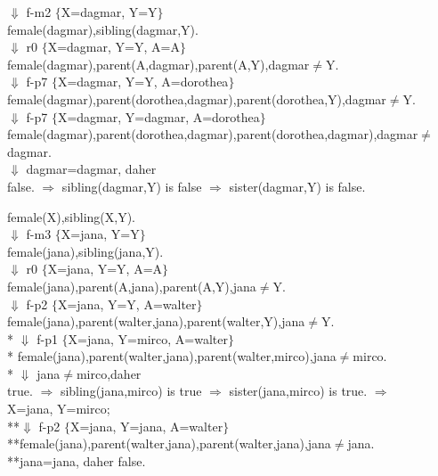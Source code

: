 \documentclass[a4paper, dvipsnames]{article}
\begin{document}
{{\begin{flushleft}
 $\Downarrow$ f-m2 $\lbrace$X=dagmar, Y=Y$\rbrace$\\
 female(dagmar),sibling(dagmar,Y).\\
 $\Downarrow$ r0 $\lbrace$X=dagmar, Y=Y, A=A$\rbrace$\\
 female(dagmar),parent(A,dagmar),parent(A,Y),dagmar$\neq$Y. \\
 $\Downarrow$ f-p7 $\lbrace$X=dagmar, Y=Y, A=dorothea$\rbrace$\\
 female(dagmar),parent(dorothea,dagmar),parent(dorothea,Y),dagmar$\neq$Y. \\
$\Downarrow$ f-p7 $\lbrace$X=dagmar, Y=dagmar, A=dorothea$\rbrace$\\
female(dagmar),parent(dorothea,dagmar),parent(dorothea,dagmar),dagmar$\neq$dagmar. \\
$\Downarrow$  dagmar=dagmar, daher\\
 false. $\Rightarrow$ sibling(dagmar,Y)  is false $\Rightarrow$ sister(dagmar,Y) is false. \\
 \end{flushleft}
 \begin{flushleft}
 female(X),sibling(X,Y).\\
 $\Downarrow$ f-m3 $\lbrace$X=jana, Y=Y$\rbrace$\\
 female(jana),sibling(jana,Y).\\
 $\Downarrow$ r0 $\lbrace$X=jana, Y=Y, A=A$\rbrace$\\
 female(jana),parent(A,jana),parent(A,Y),jana$\neq$Y. \\
 $\Downarrow$ f-p2 $\lbrace$X=jana, Y=Y, A=walter$\rbrace$\\
 female(jana),parent(walter,jana),parent(walter,Y),jana$\neq$Y. \\
* $\Downarrow$ f-p1 $\lbrace$X=jana, Y=mirco, A=walter$\rbrace$\\
* female(jana),parent(walter,jana),parent(walter,mirco),jana$\neq$mirco. \\
* $\Downarrow$ jana$\neq$mirco,daher \\
true. $\Rightarrow$ sibling(jana,mirco)  is true $\Rightarrow$ sister(jana,mirco) is true. $\Rightarrow$\\
X=jana, Y=mirco;\\
**$\Downarrow$ f-p2 $\lbrace$X=jana, Y=jana, A=walter$\rbrace$\\
**female(jana),parent(walter,jana),parent(walter,jana),jana$\neq$jana. \\
**jana=jana, daher false.
 \end{flushleft} 
  \begin{flushleft}

\end{flushleft}}}
\end{document}
